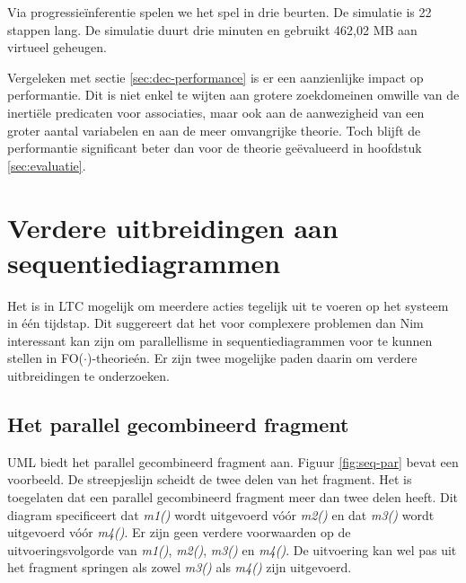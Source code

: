 Via progressie\"inferentie spelen we het spel in drie beurten. De simulatie is 22 stappen lang. De simulatie duurt drie minuten en gebruikt 462,02 MB aan virtueel geheugen.

Vergeleken met sectie \ref{sec:dec-performance} is er een aanzienlijke impact op performantie. Dit is niet enkel te wijten aan grotere zoekdomeinen omwille van de inerti\"ele predicaten voor associaties, maar ook aan de aanwezigheid van een groter aantal variabelen en aan de meer omvangrijke theorie. Toch blijft de performantie significant beter dan voor de theorie ge\"evalueerd in hoofdstuk \ref{sec:evaluatie}.

\section{Verdere uitbreidingen aan sequentiediagrammen}

Het is in LTC mogelijk om meerdere acties tegelijk uit te voeren op het systeem in \'e\'en tijdstap. Dit suggereert dat het voor complexere problemen dan Nim interessant kan zijn om parallellisme in sequentiediagrammen voor te kunnen stellen in FO($\cdot$)-theorie\'en. Er zijn twee mogelijke paden daarin om verdere uitbreidingen te onderzoeken.

\subsection{Het parallel gecombineerd fragment}

UML biedt het parallel gecombineerd fragment aan. Figuur \ref{fig:seq-par} bevat een voorbeeld. De streepjeslijn scheidt de twee delen van het fragment. Het is toegelaten dat een parallel gecombineerd fragment meer dan twee delen heeft. Dit diagram specificeert dat \textit{m1()} wordt uitgevoerd v\'o\'or \textit{m2()} en dat \textit{m3()} wordt uitgevoerd v\'o\'or \textit{m4()}. Er zijn geen verdere voorwaarden op de uitvoeringsvolgorde van \textit{m1()}, \textit{m2()}, \textit{m3()} en \textit{m4()}. De uitvoering kan wel pas uit het fragment springen als zowel \textit{m3()} als \textit{m4()} zijn uitgevoerd.

